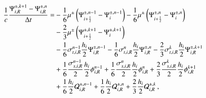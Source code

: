 \documentclass[preprint,12pt]{elsarticle}
\begin{document}
\begin{equation}\lequ{S2BDF2fullR}\begin{split}
  \frac{1}{c}\frac{\Psi\iR^{\pm,k+1}-\Psi\iR^{\pm,n}}{\dt} = &
   -\sixth\mu^\pm\fn{\Psi^{\pm,n-1}_{i+\half} - \Psi^{\pm,n-1}_i}
   -\sixth\mu^\pm\fn{\Psi^{\pm,n}_{i+\half} - \Psi^{\pm,n}_i}\\
  &-\frac{2}{3}\mu^\pm\fn{\Psi^{\pm,k+1}_{i+\half} - \Psi^{\pm,k+1}_i}\\
  &-\sixth\sigma_{t,i,R}^{n-1}\frac{h_i}{2}\Psi\iR^{\pm,n-1}
   -\sixth\sigma_{t,i,R}^{n}  \frac{h_i}{2}\Psi\iR^{\pm,n}
   -\frac{2}{3}\sigma_{t,i,R}^k\frac{h_i}{2}\Psi\iR^{\pm,k+1}\\
  &+\sixth\frac{\sigma_{s,i,R}^{n-1}}{2}\frac{h_i}{2}\phi\iR^{n-1}
   +\sixth\frac{\sigma_{s,i,R}^{n}}{2}  \frac{h_i}{2}\phi\iR^{n}
   +\frac{2}{3}\frac{\sigma_{s,i,R}^k}{2}\frac{h_i}{2}\phi\iR^{k+1}\\
  &+\sixth\frac{h_i}{2}\Q_{i,R}^{\pm,n-1}
   +\sixth\frac{h_i}{2}\Q_{i,R}^{\pm,n}
   +\frac{2}{3}\frac{h_i}{2}\Q_{i,R}^{\pm,k} \pec
\end{split}\end{equation}
\end{document}
